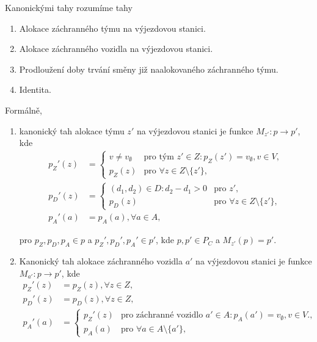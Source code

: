 \begin{definice}
  Kanonickými tahy rozumíme tahy
  \begin{enumerate}
    \item
      Alokace záchranného týmu na výjezdovou stanici.

    \item
      Alokace záchranného vozidla na výjezdovou stanici.

    \item
      Prodloužení doby trvání směny již naalokovaného záchranného týmu. 

    \item
      Identita.
  \end{enumerate}

  Formálně,
  \begin{enumerate}
    \item
      kanonický tah alokace týmu $z'$ na výjezdovou stanici je funkce $M_{z'} : p \rightarrow p'$, kde
      \begin{align*}
        p_Z'(z) &=
          \begin{cases}
            v \neq v_{\emptyset} & \text{pro tým $z' \in Z \colon p_Z(z') = v_{\emptyset}, v \in V$}, \\
            p_Z(z) & \text{pro $\forall z \in Z \setminus \{ z' \}$},
          \end{cases}
          \\
        p_D'(z) &=
          \begin{cases}
            (d_1, d_2) \in D \colon d_2 - d_1 > 0 & \text{pro $z'$}, \\
            p_D(z) & \text{pro $\forall z \in Z \setminus \{ z' \}$},
          \end{cases}
          \\
        p_A'(a) &= p_A(a), \forall a \in A,
      \end{align*}

      pro $p_Z, p_D, p_A \in p$ a $p_Z', p_D', p_A' \in p'$, kde $p, p' \in P_C$ a $M_{z'}(p) = p'$.

    \item
      Kanonický tah alokace záchranného vozidla $a'$ na výjezdovou stanici je funkce $M_{a'} : p \rightarrow p'$, kde
      \begin{align*}
        p_Z'(z) &= p_Z(z), \forall z \in Z,
        \\
        p_D'(z) &= p_D(z), \forall z \in Z,
        \\
        p_A'(a) &=
        \begin{cases}
          p_Z'(z) & \text{pro záchranné vozidlo $a' \in A \colon p_A(a') = v_{\emptyset}, v \in V$.}, \\
          p_A(a) & \text{pro $\forall a \in A \setminus \{ a' \}$},
        \end{cases}
      \end{align*}


\end{enumerate}
\end{definice}
